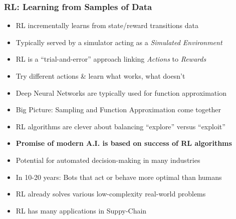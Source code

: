 \documentclass[handout]{beamer}
\begin{document}
\begin{frame}
\frametitle{RL: Learning from Samples of Data}
\pause
\begin{itemize}[<+->]
\item RL incrementally learns from state/reward transitions data
\item Typically served by a simulator acting as a {\em Simulated Environment}
\item RL is a ``trial-and-error'' approach linking {\em Actions} to {\em Rewards}
\item Try different actions \& learn what works, what doesn't
\item Deep Neural Networks are typically used for function approximation
\item Big Picture: Sampling and Function Approximation come together
\item RL algorithms are clever about balancing  ``explore'' versus ``exploit''
\item {\bf Promise of modern A.I. is based on success of RL algorithms}
\item Potential for automated decision-making in many industries
\item In 10-20 years: Bots that act or behave more optimal than humans
\item RL already solves various low-complexity real-world problems
\item RL has many applications in Suppy-Chain
\end{itemize}
\end{frame}
\end{document}
